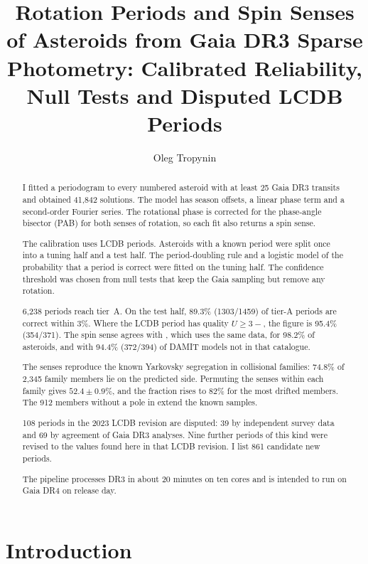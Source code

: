 \documentclass[twocolumn]{aastex631}
\begin{document}
\title{Rotation Periods and Spin Senses of Asteroids from Gaia DR3 Sparse Photometry: Calibrated Reliability, Null Tests and Disputed LCDB Periods}

\author{Oleg Tropynin}

\begin{abstract}
I fitted a periodogram to every numbered asteroid with at least 25 Gaia DR3 transits and obtained 41{,}842
solutions. The model has season offsets, a linear phase term and a second-order Fourier series. The
rotational phase is corrected for the phase-angle bisector (PAB) for both senses of rotation, so each fit
also returns a spin sense.

The calibration uses LCDB periods. Asteroids with a known period were split once into a tuning half and a
test half. The period-doubling rule and a logistic model of the probability that a period is correct were
fitted on the tuning half. The confidence threshold was chosen from null tests that keep the Gaia sampling
but remove any rotation.

6{,}238 periods reach tier~A. On the test half, 89.3\% (1303/1459) of tier-A periods are correct within 3\%.
Where the LCDB period has quality $U\ge3-$, the figure is 95.4\% (354/371). The spin sense agrees with
\citet{Durech2023}, which uses the same data, for 98.2\% of asteroids, and with 94.4\% (372/394) of DAMIT
models not in that catalogue.

The senses reproduce the known Yarkovsky segregation in collisional families: 74.8\% of 2{,}345 family
members lie on the predicted side. Permuting the senses within each family gives $52.4\pm0.9\%$, and the
fraction rises to 82\% for the most drifted members. The 912 members without a pole in \citet{Durech2023}
extend the known samples.

108 periods in the 2023 LCDB revision are disputed: 39 by independent survey data and 69 by agreement of
Gaia DR3 analyses. Nine further periods of this kind were revised to the values found here in that LCDB
revision. I list 861 candidate new periods.

The pipeline processes DR3 in about 20 minutes on ten cores and is intended to run on Gaia DR4 on release day.
\end{abstract}


\section{Introduction}
\end{document}
